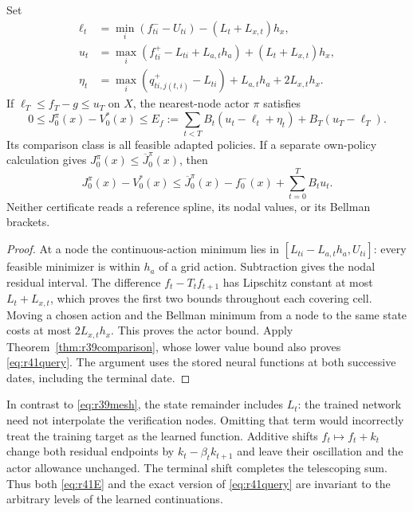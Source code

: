 \begin{proposition}
\label{prop:r41direct}
Set
\begin{align}
 \ell_t&=\min_i(f^-_{ti}-U_{ti})-(L_t+L_{x,t})h_x,
       \label{eq:r41direct}\\
 u_t&=\max_i(f^+_{ti}-L_{ti}+L_{a,t}h_a)
                         +(L_t+L_{x,t})h_x,\nonumber\\
 \eta_t&=\max_i(q^+_{ti,j(t,i)}-L_{ti})+L_{a,t}h_a+2L_{x,t}h_x.
       \nonumber
\end{align}
If $\ell_T\leq f_T-g\leq u_T$ on $X$, the nearest-node actor $\pi$ satisfies
\begin{equation}
 0\leq J_0^\pi(x)-V_0^*(x)\leq
 E_f:=\sum_{t<T}B_t(u_t-\ell_t+\eta_t)+B_T(u_T-\ell_T).
 \label{eq:r41E}
\end{equation}
Its comparison class is all feasible adapted policies. If a separate
own-policy calculation gives $J_0^\pi(x)\leq\overline J_0^\pi(x)$, then
\begin{equation}
 J_0^\pi(x)-V_0^*(x)
 \leq\overline J_0^\pi(x)-f^-_0(x)+\sum_{t=0}^TB_tu_t.
 \label{eq:r41query}
\end{equation}
Neither certificate reads a reference spline, its nodal values, or its
Bellman brackets.
\end{proposition}
\begin{proof}
At a node the continuous-action minimum lies in
$[L_{ti}-L_{a,t}h_a,U_{ti}]$: every feasible minimizer is within $h_a$ of a
grid action. Subtraction gives the nodal residual interval. The difference
$f_t-T_tf_{t+1}$ has Lipschitz constant at most $L_t+L_{x,t}$, which proves
the first two bounds throughout each covering cell. Moving a chosen action
and the Bellman minimum from a node to the same state costs at most
$2L_{x,t}h_x$. This proves the actor bound. Apply
Theorem~\ref{thm:r39comparison}, whose lower value bound also proves
\eqref{eq:r41query}. The argument uses the stored neural functions at both
successive dates, including the terminal date.
\end{proof}

In contrast to \eqref{eq:r39mesh}, the state remainder includes $L_t$:
the trained network need not interpolate the verification nodes. Omitting
that term would incorrectly treat the training target as the learned
function. Additive shifts $f_t\mapsto f_t+k_t$ change both residual endpoints
by $k_t-\beta_tk_{t+1}$ and leave their oscillation and the actor allowance
unchanged. The terminal shift completes the telescoping sum. Thus both
\eqref{eq:r41E} and the exact version of \eqref{eq:r41query} are invariant
to the arbitrary levels of the learned continuations.

